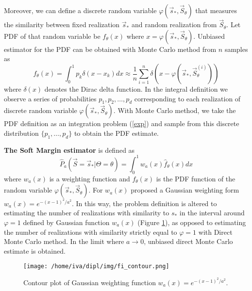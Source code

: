 \documentclass[times, utf8, diplomski]{fer}
\begin{document}
Moreover, we  can define a discrete random variable $\varphi(\vec s_*, \vec S_{\theta})$ that measures the similarity between fixed realization $\vec s_*$ and random realization from $\vec S_{\theta}$. Let PDF of that random variable be $f_\theta(x)$ where $x = \varphi(\vec s_*, \vec S_{\theta})$. Unbiased estimator for the PDF can be obtained with Monte Carlo method from $n$  samples as 
\begin{equation}
f_{\theta}(x) = \int_0^1 p_k \delta(x - x_k)dx \approx \frac{1}{n} \sum_{i = 1}^{n} \delta(x - \varphi(\vec s_*, \vec S_{\theta} ^{(i)}))
\label{Fapprox}
\end{equation}
where $\delta(x)$ denotes the Dirac delta function. In the integral definition we observe a series of probabilities $p_1, p_2, \ldots, p_d$ corresponding to each realization of discrete random variable $\varphi(\vec s_*, \vec S_{\theta})$. With Monte Carlo method, we take the PDF definition as an integration problem (\ref{exp}) and sample from this discrete distribution $\{p_1, \ldots, p_d\}$ to obtain the PDF estimate.

\textbf{The Soft Margin estimator} is defined as 
\begin{equation}
\hat{P}_a(\vec S = \vec s_* | \Theta = \theta) = \int_0^1 w_a(x)\hat{f}_\theta(x)dx
\label{SMF1}
\end{equation}
where $w_a(x)$ is a weighting function and $f_\theta(x)$ is the PDF function of the random variable $\varphi(\vec s_*, \vec S_\theta)$. For $w_a(x)$ \citet{Nino} proposed a Gaussian weighting form $w_a(x) = e^{-(x -1)^2 / a ^2}$. In this way, the problem definition is altered to estimating the number of realizations with similarity to $s_*$ in the interval around $\varphi = 1$  defined by Gaussian function $w_a(x)$  (Figure \ref{wax}), as opposed to estimating the number of realizations with similarity strictly equal to $\varphi = 1$ with Direct Monte Carlo method. In the limit where $a \rightarrow 0$, unbiased direct Monte Carlo estimate is obtained.
\begin{figure}
\center
\texttt{[image: /home/iva/dipl/img/fi\_contour.png]}
\caption{Contour plot of Gaussian weighting function $w_a(x) = e^{-(x -1)^2 / a ^2}$.}
\label{wax}
\end{figure}
\end{document}
